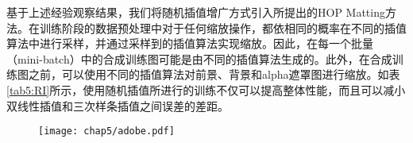 基于上述经验观察结果，我们将随机插值增广方式引入所提出的HOP Matting方法。在训练阶段的数据预处理中对于任何缩放操作，都依相同的概率在不同的插值算法中进行采样，并通过采样到的插值算法实现缩放。因此，在每一个批量（mini-batch）中的合成训练图可能是由不同的插值算法生成的。此外，在合成训练图之前，可以使用不同的插值算法对前景、背景和alpha遮罩图进行缩放。如表\ref{tab5:RI}所示，使用随机插值所进行的训练不仅可以提高整体性能，而且可以减小双线性插值和三次样条插值之间误差的差距。

\begin{figure}[t]
	\centering
	\texttt{[image: chap5/adobe.pdf]}
	\label{fig5:adobe}
\end{figure}


